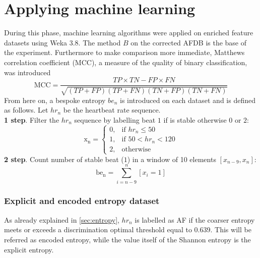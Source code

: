 \section{Applying machine learning}
During this phase, machine learning algorithms were applied on enriched feature datasets using Weka 3.8. The method $B$  on the corrected AFDB is the base of the experiment. Furthermore to make comparison more immediate, Matthews correlation coefficient (MCC), a measure of the quality of binary classification, was introduced
\begin{equation}
\mathrm{MCC}=\frac{TP \times TN-FP \times FN}{\sqrt{(TP+FP)(TP+FN)(TN+FP)(TN+FN)}}
\end{equation}
From here on, a bespoke entropy $be_n$ is introduced on each dataset and is defined as follows. Let $hr_n$ be the heartbeat rate sequence. \\
\textbf{1 step}. Filter the $hr_n$ sequence by labelling beat $1$ if is stable otherwise $0$ or $2$:\\
\begin{equation}
\mathrm{x_n} = \begin{cases}
	0, & \text{if } hr_n \le 50 \\
	1, & \text{if } 50 < hr_n < 120 \\
    2,              & \text{otherwise} 
\end{cases}
\end{equation}
\textbf{2 step}. Count number of stable beat ($1$) in a window of 10 elements $[x_{n-9}, x_{n}]$:\\
\begin{equation}
\mathrm{be_n} = \sum_{i=n-9}^{n} [x_i=1]
\end{equation}

\subsubsection{Explicit and encoded entropy dataset}
As already explained in \ref{sec:entropy}, $hr_n$ is labelled as AF if the coarser entropy meets or exceeds a discrimination optimal threshold equal to 0.639. This will be referred as encoded entropy, while the value itself of the Shannon entropy is the explicit entropy. 

